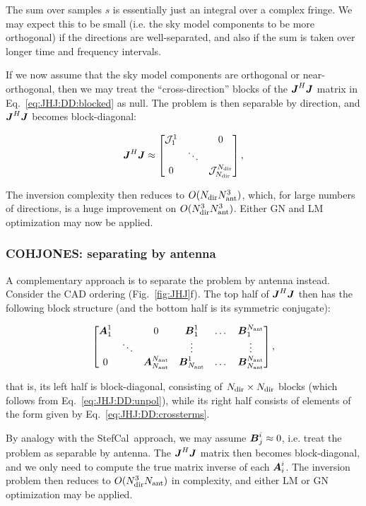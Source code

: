 \documentclass[useAMS,usenatbib]{mn2e}
\newcommand{\mat}[1]{{\bmath{#1}}}
\newcommand{\JJ}{\mat{J}} %
\newcommand{\JHJ}{\JJ^H\JJ} %
\newcommand{\StefCal}{{\sc StefCal}}
\begin{document}
The sum over samples $s$ is essentially just an integral over a complex fringe. We may expect this to be small (i.e. the
sky model components to be more orthogonal) if the directions are well-separated, and also if the sum is taken 
over longer time and frequency intervals. 

If we now assume that the sky model components are orthogonal or near-orthogonal, then 
we may treat the ``cross-direction'' blocks of the $\JHJ$ matrix in Eq.~\ref{eq:JHJ:DD:blocked} as null. The problem is 
then separable by direction, and $\JHJ$ becomes block-diagonal:


\begin{equation}
\label{eq:JHJ:DD:block-diag}
\JHJ \approx \Matrix{ccc}{\JJJ^1_1 &  & 0 \\
& \ddots &  \\
0 & & \JJJ_{\Nd}^{\Nd} },
\end{equation}

The inversion complexity then reduces to $O(N_\mathrm{dir}N_\mathrm{ant}^3)$, which, for large numbers of directions, is a huge improvement on 
$O(N_\mathrm{dir}^3N_\mathrm{ant}^3)$. Either GN and LM optimization may now be applied. 



\subsubsection{COHJONES: separating by antenna}

A complementary approach is to separate the problem by antenna instead. Consider the CAD ordering (Fig.~\ref{fig:JHJ}f). 
The top half of $\JHJ$ then has the following block structure (and the bottom half is its symmetric conjugate):

\newcommand{\JJX}{\bmath{A}}
\newcommand{\JJY}{\bmath{B}}

\begin{equation}
\label{eq:JHJ:DD:blocked-ant}
\Matrix{cccccc}{\JJX^1_1 &  & 0 & \JJY^1_1 & \dots & \JJY^{\Na}_1 \\
 & \ddots &  & \vdots & & \vdots \\
0 &  & \JJX_{\Na}^{\Na} & \JJY_{\Na}^1 & \dots & \JJY_{\Na}^{\Na} },
\end{equation}

that is, its left half is block-diagonal, consisting of $N_\mathrm{dir}\times N_\mathrm{dir}$ blocks (which follows
from Eq.~\ref{eq:JHJ:DD:unpol}), while its right half consists of elements of the form given by
Eq.~\ref{eq:JHJ:DD:crossterms}. 

By analogy with the \StefCal\ approach, we may assume $\JJY^i_j \approx 0$, i.e. treat the problem as
separable by antenna. The $\JHJ$ matrix then becomes block-diagonal, and we only need to compute the 
true matrix inverse of each $\JJX^i_i$. The inversion problem then reduces to $O(N_\mathrm{dir}^3N_\mathrm{ant})$ in complexity,
and either LM or GN optimization may be applied.
\end{document}

